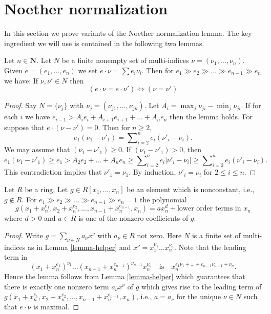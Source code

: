\section{Noether normalization}
\label{section-Noether-normalization}

\noindent
In this section we prove variants of the Noether normalization lemma.
The key ingredient we will use is contained in the following two lemmas.

\begin{lemma}
\label{lemma-helper}
Let $n \in \mathbf{N}$.
Let $N$ be a finite nonempty
set of multi-indices $\nu = (\nu_1, \ldots, \nu_n)$.
Given $e = (e_1, \ldots, e_n)$ we set $e \cdot \nu = \sum e_i\nu_i$.
Then for $e_1 \gg e_2 \gg \ldots \gg e_{n-1} \gg e_n$ we have:
If $\nu, \nu' \in N$ then
$$
(e \cdot \nu = e \cdot \nu')
\Leftrightarrow
(\nu = \nu')
$$
\end{lemma}

\begin{proof}
Say $N = \{\nu_j\}$ with $\nu_j = (\nu_{j1}, \ldots, \nu_{jn})$.
Let $A_i = \max_j \nu_{ji} - \min_j \nu_{ji}$. If for each $i$ we have
$e_{i - 1} > A_ie_i + A_{i + 1}e_{i + 1} + \ldots + A_ne_n$ then
the lemma holds. For suppose that $e \cdot (\nu - \nu') = 0$. Then for
$n \ge 2$,
$$
e_1(\nu_1 - \nu'_1) = \sum\nolimits_{i = 2}^n e_i(\nu'_i - \nu_i).
$$
We may assume that $(\nu_1 - \nu'_1) \ge 0$. If $(\nu_1 - \nu'_1) > 0$, then
$$
e_1(\nu_1 - \nu'_1) \ge e_1 >
A_2e_2 + \ldots + A_ne_n \ge
\sum\nolimits_{i = 2}^n e_i|\nu'_i - \nu_i| \ge
\sum\nolimits_{i = 2}^n e_i(\nu'_i - \nu_i).
$$
This contradiction implies that $\nu'_1 = \nu_1$. By
induction, $\nu'_i = \nu_i$ for $2 \le i \le n$.
\end{proof}

\begin{lemma}
\label{lemma-helper-polynomial}
Let $R$ be a ring. Let $g \in R[x_1, \ldots, x_n]$ be an element
which is nonconstant, i.e., $g \not \in R$.
For $e_1 \gg e_2 \gg \ldots \gg e_{n-1} \gg e_n = 1$ the polynomial
$$
g(x_1 + x_n^{e_1}, x_2 + x_n^{e_2}, \ldots, x_{n - 1} + x_n^{e_{n - 1}}, x_n)
=
ax_n^d + \text{lower order terms in }x_n
$$
where $d > 0$ and $a \in R$ is one of the nonzero coefficients of $g$.
\end{lemma}

\begin{proof}
Write $g = \sum_{\nu \in N} a_\nu x^\nu$ with $a_\nu \in R$ not zero.
Here $N$ is a finite set of multi-indices as in
Lemma \ref{lemma-helper}
and $x^\nu = x_1^{\nu_1} \ldots x_n^{\nu_n}$.
Note that the leading term in
$$
(x_1 + x_n^{e_1})^{\nu_1} \ldots (x_{n-1} + x_n^{e_{n-1}})^{\nu_{n-1}}
x_n^{\nu_n}
\quad\text{is}\quad
x_n^{e_1\nu_1 + \ldots + e_{n-1}\nu_{n-1} + \nu_n}.
$$
Hence the lemma follows from
Lemma \ref{lemma-helper}
which guarantees that there is exactly one nonzero term $a_\nu x^\nu$ of $g$
which gives rise to the leading term of
$g(x_1 + x_n^{e_1}, x_2 + x_n^{e_2}, \ldots, x_{n - 1} + x_n^{e_{n - 1}},
x_n)$, i.e., $a = a_\nu$ for the unique $\nu \in N$ such that
$e \cdot \nu$ is maximal.
\end{proof}

